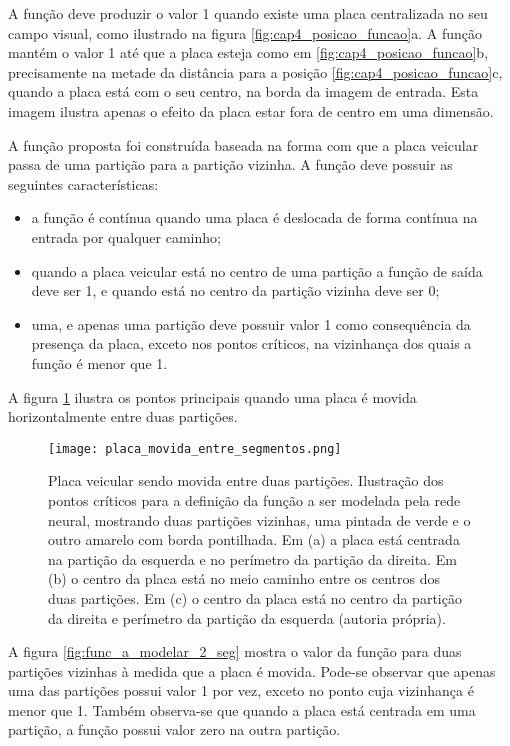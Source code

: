 A função deve produzir o valor 1 quando existe uma placa centralizada no
seu campo visual, como ilustrado na figura \ref{fig:cap4_posicao_funcao}a.
A função mantém o valor 1 até que a placa esteja como em
\ref{fig:cap4_posicao_funcao}b, precisamente na metade da distância para a
posição \ref{fig:cap4_posicao_funcao}c, quando a placa está com o seu centro,
na borda da imagem de entrada. Esta imagem ilustra apenas o efeito da placa
estar fora de centro em uma dimensão.

A função proposta foi construída baseada na forma com que a placa veicular
passa de uma partição para a partição vizinha. A função deve possuir as
seguintes características:

\begin{itemize}
\item a função é contínua quando uma placa é deslocada de forma contínua na
	entrada por qualquer caminho;
\item quando a placa veicular está no centro de uma partição a função de
	saída deve ser 1, e quando está no centro da partição vizinha deve ser 0;
\item uma, e apenas uma partição deve possuir valor 1 como consequência da
	presença da placa, exceto nos pontos críticos, na vizinhança dos quais a
	função é menor que 1.
\end{itemize}

A figura \ref{fig:placa_movida_entre_segmentos} ilustra os pontos principais
quando uma placa é movida horizontalmente entre duas partições.

\begin{figure}[!htb]
	\centering
	\texttt{[image: placa\_movida\_entre\_segmentos.png]}
	\caption[Placa veicular sendo movida entre duas partições]{
		Placa veicular sendo movida entre duas partições.
		Ilustração dos pontos críticos para a definição da função a ser modelada
		pela rede neural, mostrando duas partições vizinhas, uma pintada de verde e
		o outro amarelo com borda pontilhada. Em (a) a placa está centrada na
		partição da esquerda e no perímetro da partição da direita.
		Em (b) o centro da placa está no meio caminho entre os centros dos duas
		partições. Em (c) o centro da placa está no centro da partição da direita e
		perímetro da partição da esquerda (autoria própria).}
	\label{fig:placa_movida_entre_segmentos}
\end{figure}

A figura \ref{fig:func_a_modelar_2_seg} mostra o valor da função para
duas partições vizinhas à medida que a placa é movida. Pode-se observar que
apenas uma das partições possui valor 1 por vez, exceto no ponto cuja
vizinhança é menor que 1. Também observa-se
que quando a placa está centrada em uma partição, a função possui valor zero
na outra partição.

